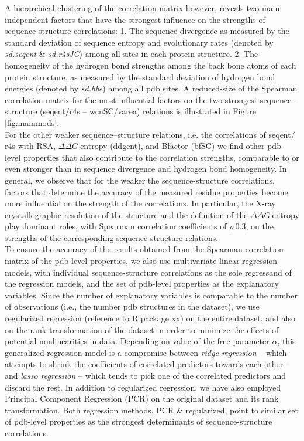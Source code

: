 \documentclass[11pt]{article}
\newcommand{\ddg}{$\Delta\Delta G~$}
\begin{document}
        A hierarchical clustering of the correlation matrix however, reveals two main independent factors that have the strongest influence on the strengths of sequence-structure correlations: 1. The sequence divergence as measured by the standard deviation of sequence entropy and evolutionary rates (denoted by {\it sd.seqent} \& {\it sd.r4sJC}) among all sites in each protein structure.   2. The homogeneity of the hydrogen bond strengths among the back bone atoms of each protein structure, as measured by the standard deviation of hydrogen bond energies (denoted by {\it sd.hbe}) among all pdb sites.   A reduced-size of the Spearman correlation matrix for the most influential factors on the two strongest sequence--structure (seqent$/$r4s -- wcnSC$/$varea) relations is illustrated in Figure \ref{fig:mainmods}.
        \\

        For the other weaker sequence--structure relations, i.e. the correlations of seqent$/$r4s with RSA, \ddg entropy (ddgent), and Bfactor (bfSC) we find other pdb-level properties that also contribute to the correlation strengths, comparable to or even stronger than in sequence divergence and hydrogen bond homogeneity. In general, we observe that for the weaker the sequence-structure correlations, factors that determine the accuracy of the measured residue properties become more influential on the strength of the correlations. In particular, the X-ray crystallographic resolution of the structure and the definition of the \ddg entropy play dominant roles, with Spearman correlation coefficients of $\rho~0.3$, on the strengths of the corresponding sequence-structure relations.
        \\

        To ensure the accuracy of the results obtained from the Spearman correlation matrix of the pdb-level properties, we also use multivariate linear regression models, with individual sequence-structure correlations as the sole regressand of the regression models, and the set of pdb-level properties as the explanatory variables.  Since the number of explanatory variables is comparable to the number of observations (i.e., the number pdb structures in the dataset), we use regularized regression (reference to R package xx) on the entire dataset, and also on the rank transformation of the dataset in order to minimize the effects of potential nonlinearities in data. Depending on value of the free parameter $\alpha$, this generalized regression model is a compromise between {\it ridge regression} -- which attempts to shrink the coefficients of correlated predictors towards each other -- and {\it lasso regression} -- which tends to pick one of the correlated predictors and discard the rest. In addition to regularized regression, we have also employed Principal Component Regression (PCR) on the original dataset and its rank transformation. Both regression methods, PCR \& regularized, point to similar set of pdb-level properties as the strongest determinants of sequence-structure correlations.
\end{document}
